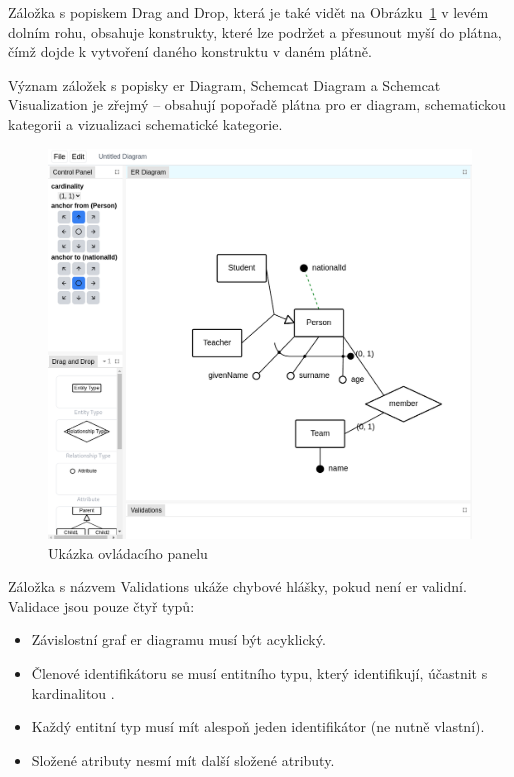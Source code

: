 Záložka s popiskem Drag and Drop, která je také vidět na Obrázku~\ref{fig:control-panel} v levém dolním rohu, obsahuje konstrukty, které lze podržet a přesunout myší do plátna, čímž dojde k vytvoření daného konstruktu v daném plátně.

Význam záložek s popisky \acrshort{er} Diagram, Schemcat Diagram a Schemcat Visualization je zřejmý -- obsahují popořadě plátna pro \acrshort{er} diagram, schematickou kategorii a vizualizaci schematické kategorie.

\begin{figure}[!htb]
  \centering
  \includegraphics[width=\maxwidth{\textwidth}]{../img/app/control-panel.png}
  \caption{Ukázka ovládacího panelu}
  \label{fig:control-panel}
\end{figure}

Záložka s názvem Validations ukáže chybové hlášky, pokud není \acrshort{er} validní.
Validace jsou pouze čtyř typů:
\begin{itemize}
  \item Závislostní graf \acrshort{er} diagramu musí být acyklický.
  \item Členové identifikátoru se musí entitního typu, který identifikují, účastnit s kardinalitou \oneone{}.
  \item Každý entitní typ musí mít alespoň jeden identifikátor (ne nutně vlastní).
  \item Složené atributy nesmí mít další složené atributy.
\end{itemize}

